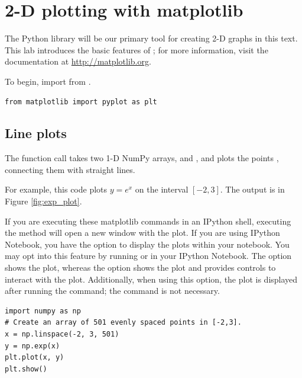 \label{lab:Matplotlib_and_Mayavi}

\section*{2-D plotting with matplotlib}
The Python library  will be our primary tool for creating 2-D graphs in this text. This lab introduces the basic features of ; for more information, visit the documentation at \url{http://matplotlib.org}.

To begin, import  from .
\begin{lstlisting}
from matplotlib import pyplot as plt
\end{lstlisting}

\subsection*{Line plots}
The function call  takes two 1-D NumPy arrays,  and , and plots the points , connecting them with straight lines.

For example, this code plots $y=e^x$ on the interval $[-2,3]$. The output is in Figure \ref{fig:exp_plot}.

\begin{info}
If you are executing these matplotlib commands in an IPython shell, executing the  method will open a new window with the plot. If you are using IPython Notebook, you have the option to display the plots within your notebook. You may opt into this feature by running  or  in your IPython Notebook. The  option shows the plot, whereas the  option shows the plot and provides controls to interact with the plot. Additionally, when using this option, the plot is displayed after running the  command; the  command is not necessary.
\end{info}

\begin{lstlisting}
import numpy as np
# Create an array of 501 evenly spaced points in [-2,3].
x = np.linspace(-2, 3, 501)
y = np.exp(x)
plt.plot(x, y)
plt.show()
\end{lstlisting}

